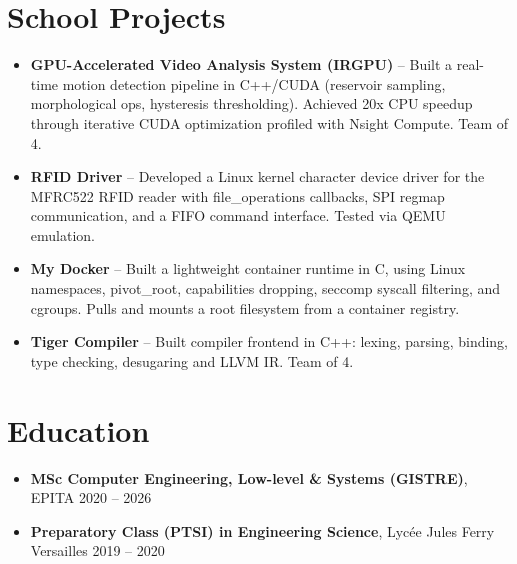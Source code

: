 \documentclass[9pt,a4paper]{article}
\begin{document}
\section*{School Projects}
\begin{tcolorbox}[mybox]
\begin{itemize}
\item \textbf{GPU-Accelerated Video Analysis System (IRGPU)} -- Built a real-time motion detection pipeline in C++/CUDA (reservoir sampling, morphological ops, hysteresis thresholding). Achieved 20x CPU speedup through iterative CUDA optimization profiled with Nsight Compute. Team of 4.

\item \textbf{RFID Driver} -- Developed a Linux kernel character device driver for the MFRC522 RFID reader with file\_operations callbacks, SPI regmap communication, and a FIFO command interface. Tested via QEMU emulation.

\item \textbf{My Docker} -- Built a lightweight container runtime in C, using Linux namespaces, pivot\_root, capabilities dropping, seccomp syscall filtering, and cgroups. Pulls and mounts a root filesystem from a container registry.

\item \textbf{Tiger Compiler} -- Built compiler frontend in C++: lexing, parsing, binding, type checking, desugaring and LLVM IR. Team of 4.
\end{itemize}
\end{tcolorbox}


\section*{Education}
\begin{tcolorbox}[mybox]
\begin{itemize}
\item \textbf{MSc Computer Engineering, Low-level \& Systems (GISTRE)}, EPITA {\small{\hfill 2020 – 2026}}

\item \textbf{Preparatory Class (PTSI) in Engineering Science}, Lycée Jules Ferry Versailles {\small{\hfill 2019 – 2020}}
\end{itemize}
\end{tcolorbox}
\end{document}
